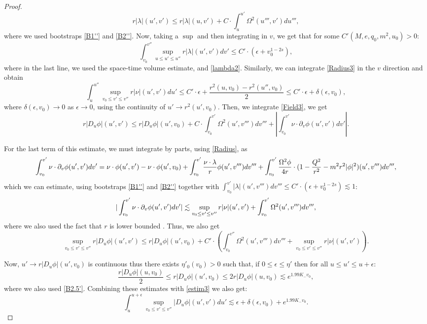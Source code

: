 \documentclass[10pt,a4paper]{article}
\theoremstyle{plain}
\theoremstyle{remark}
\theoremstyle{definition}
\theoremstyle{plain}
\theoremstyle{remark}
\theoremstyle{definition}
\numberwithin{equation}{section}
\begin{document}
\begin{proof}
	$$ r|\lambda|(u',v') \leq r|\lambda|(u,v') +C \cdot \int_{u}^{u'}  \Omega^2(u''',v') du''',$$ where we used bootstraps \eqref{B1''} and \eqref{B2''}.
	Now, taking a $\sup$ and then integrating in $v$, we get that for some $C'(M,e,q_0,m^2,u_0)>0$: \begin{equation} \label{estim4}
	\int_{v_0}^{v''}\sup_{ u \leq u' \leq u'' }r|\lambda|(u',v') dv' \leq C' \cdot( \epsilon+v_0^{1-2s}),
	\end{equation} where in the last line, we used the space-time volume estimate, and \eqref{lambda2}. Similarly, we can integrate \eqref{Radius3} in the $v$ direction and obtain \begin{equation} \label{estim3}
	\int_{u}^{u''}\sup_{ v_0 \leq v' \leq v'' }r|\nu|(u',v') du' \leq C' \cdot \epsilon + \frac{ r^2(u,v_0)- r^2(u'',v_0)}{2} \leq C' \cdot \epsilon +\delta(\epsilon,v_0),  \end{equation} where $\delta(\epsilon,v_0) \rightarrow 0$ as $\epsilon \rightarrow 0$, using the continuity of $u' \rightarrow r^2(u',v_0)$. Then, we integrate \eqref{Field3}, we get 
	$$ r|D_u \phi|(u',v') \leq r|D_u \phi|(u',v_0) +C \cdot \int_{v_0}^{v'}  \Omega^2(u',v''') dv'''+ |\int_{v_0}^{v'} \nu \cdot\partial_v \phi(u',v')  dv'|.$$
	
	For the last term of this estimate, we must integrate by parts, using \eqref{Radius}\color{black}, as $$ \int_{v_0}^{v'}  \nu \cdot \color{black} \partial_v \phi(u',v')  dv' =  \nu \cdot \color{black} \phi(u',v')- \nu \cdot \color{black} \phi(u',v_0) +  \int_{v_0}^{v'} \frac{ \nu \cdot \lambda}{r}  \color{black}\phi(u',v''')  dv'''+  \int_{v_0}^{v'}\frac{\Omega^2 \phi}{4r}\cdot (1- \frac{Q^2}{r^2}-m^2 r^2 |\phi|^2)(u',v''') dv''',$$
	which we can estimate, using bootstraps \eqref{B1''} and \eqref{B2''} together with $ \int_{v_0}^{v'}  |\lambda|(u',v''')dv'''  \leq C' \cdot( \epsilon+v_0^{1-2s})\lesssim 1$: $$   | \int_{v_0}^{v'}  \nu \cdot \color{black} \partial_v \phi(u',v')  dv'| \lesssim  \sup_{ v_0 \leq v' \leq v'' }r|\nu|(u',v')  + \int_{v_0}^{v'} \Omega^2(u',v''')dv''',$$  where we also used the fact that $r$ is lower bounded \color{black}. Thus, we also get  $$ \sup_{ v_0 \leq v' \leq v''}r|D_u \phi|(u',v') \leq r|D_u \phi|(u',v_0) +C' \cdot \left( \int_{v_0}^{v''}  \Omega^2(u',v''') dv'''+  \sup_{ v_0 \leq v' \leq v'' }r|\nu|(u',v') \right).$$
	
	Now, $u' \rightarrow r|D_u \phi|(u',v_0)$ is continuous thus there exists $\eta'_0(v_0)>0$ such that, if $0 \leq \epsilon \leq \eta'$ then for all $u \leq u' \leq u+\epsilon$: $$\frac{r|D_u \phi|(u,v_0)}{2}\leq r|D_u \phi|(u',v_0)\leq 2r|D_u \phi|(u,v_0) \lesssim e^{1.99 K_- v_0},$$ where we also used \eqref{B2.5'}. Combining these estimates with \eqref{estim3} we also get: \begin{equation}  \label{estim2}
	\int_{u}^{u+\epsilon}\sup_{ v_0 \leq v' \leq v''}|D_u \phi|(u',v') du' \lesssim \epsilon +\delta(\epsilon,v_0)+ e^{1.99 K_- v_0}.
	\end{equation}
	

\end{proof}
\end{document}
